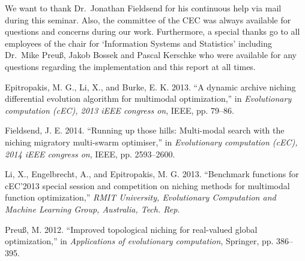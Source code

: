 \documentclass[12pt,a4paper]{article}
\begin{document}
We want to thank Dr.~Jonathan Fieldsend for his continuous help via mail
during this seminar. Also, the committee of the CEC was always available
for questions and concerns during our work. Furthermore, a special
thanks go to all employees of the chair for `Information Systems and
Statistics' including Dr.~Mike Preuß, Jakob Bossek and Pascal Kerschke
who were available for any questions regarding the implementation and
this report at all times. \newpage

\hypertarget{refs}{}
\hypertarget{ref-epitropakisux5f2013}{}
Epitropakis, M. G., Li, X., and Burke, E. K. 2013. ``A dynamic archive
niching differential evolution algorithm for multimodal optimization,''
in \emph{Evolutionary computation (cEC), 2013 iEEE congress on}, IEEE,
pp. 79--86.

\hypertarget{ref-fieldsendux5f2014}{}
Fieldsend, J. E. 2014. ``Running up those hills: Multi-modal search with
the niching migratory multi-swarm optimiser,'' in \emph{Evolutionary
computation (cEC), 2014 iEEE congress on}, IEEE, pp. 2593--2600.

\hypertarget{ref-liux5f2013}{}
Li, X., Engelbrecht, A., and Epitropakis, M. G. 2013. ``Benchmark
functions for cEC'2013 special session and competition on niching
methods for multimodal function optimization,'' \emph{RMIT University,
Evolutionary Computation and Machine Learning Group, Australia, Tech.
Rep}.

\hypertarget{ref-preussux5f2012}{}
Preuß, M. 2012. ``Improved topological niching for real-valued global
optimization,'' in \emph{Applications of evolutionary computation},
Springer, pp. 386--395.
\end{document}
